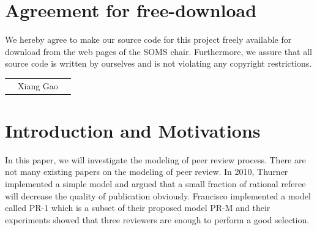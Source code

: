 \documentclass[11pt]{article}
\begin{document}

\newpage


\newpage
\section*{Agreement for free-download}
\bigskip


\bigskip


\large We hereby agree to make our source code for this project freely available for download from the web pages of the SOMS chair. Furthermore, we assure that all source code is written by ourselves and is not violating any copyright restrictions.

\begin{center}

\bigskip


\bigskip


\begin{tabular}{@{}p{3.3cm}@{}p{6cm}@{}@{}p{6cm}@{}}
\begin{minipage}{3cm}

\end{minipage}
&
\begin{minipage}{6cm}
\vspace{2mm} \large Xiang Gao

\vspace{\baselineskip}

\end{minipage}
&
\begin{minipage}{6cm}

\end{minipage}
\end{tabular}


\end{center}
\newpage


% 


\tableofcontents

\newpage


\section{Introduction and Motivations}
In this paper, we will investigate the modeling of peer review process. There are not many existing papers on the modeling of peer review. In 2010, Thurner \cite{thurner2010peer} implemented a simple model and argued that a small fraction of rational referee will decrease the quality of publication obviously. Francisco \cite{grimaldoproposal} implemented a model called PR-1 which is a subset of their proposed model PR-M and their experiments showed that three reviewers are enough to perform a good selection. 
\end{document}
